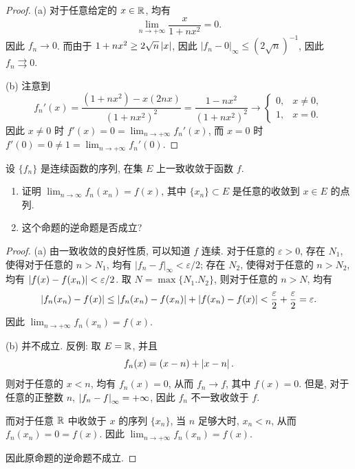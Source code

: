 \documentclass{article}
\begin{document}
\begin{proof}
  (a) 对于任意给定的 \( x\in\mathbb{R} \), 均有
  \[ \lim_{n\to+\infty}\frac{x}{1+nx^2}=0. \]
  因此 \( f_n\to 0 \). 而由于 \( 1+nx^2\ge 2\sqrt{n}\left|x\right| \), 因此 \( |f_n-0|_{\infty} \le (2\sqrt{n})^{-1} \), 因此 \( f_n \rightrightarrows 0 \).

  (b) 注意到
  \[ f_n'(x) = \frac{(1+nx^2)-x(2nx)}{(1+nx^2)^2}= \frac{1-nx^2}{(1+nx^2)^2} \to \begin{cases}
    0, & x\ne 0,\\
    1, & x=0.
  \end{cases} \]
  因此 \( x\neq 0 \) 时 \( f'(x)=0=\lim_{n\to+\infty}f_n'(x) \), 而 \( x=0 \) 时 \( f'(0)=0\ne 1=\lim_{n\to+\infty}f_n'(0) \).
\end{proof}



\begin{problem}
设 $\{f_n\}$ 是连续函数的序列, 在集 $E$ 上一致收敛于函数 $f$.
\begin{enumerate}[label=(\alph*)]
\item 证明 $\lim_{n\to\infty} f_n(x_n)=f(x)$, 其中 $\{x_n\}\subset E$ 是任意的收敛到 $x\in E$ 的点列.
\item 这个命题的逆命题是否成立?
\end{enumerate}
\end{problem}

\begin{proof}
  (a) 由一致收敛的良好性质, 可以知道 \( f \) 连续. 对于任意的 \( \varepsilon>0 \), 存在 \( N_1 \), 使得对于任意的 \( n>N_1 \), 均有 \( |f_n-f|_\infty<\varepsilon/2 \); 存在 \( N_2 \), 使得对于任意的 \( n>N_2 \), 均有 \( \left|f(x)-f(x_n)\right|<\varepsilon/2 \). 取 \( N=\max\{N_1.N_2\} \), 则对于任意的 \( n>N \), 均有
  \[ \left|f_n(x_n)-f(x)\right| \leq \left|f_n(x_n)-f(x_n)\right| + \left|f(x_n)-f(x)\right| < \frac{\varepsilon}{2}+\frac{\varepsilon}{2}=\varepsilon. \]
  因此 \( \lim_{n\to +\infty}f_n(x_n)=f(x) \). 

  (b) 并不成立. 反例: 取 \( E=\mathbb{R} \), 并且
  \[ f_n(x)= (x-n)+\left|x-n\right|. \]
  则对于任意的 \( x<n \), 均有 \( f_n(x)=0 \), 从而 \( f_n \to f \), 其中 \( f(x)=0 \). 但是, 对于任意的正整数 \( n \), \( \left|f_n-f\right|_{\infty}=+\infty \), 因此 \( f_n \) 不一致收敛于 \( f \).

  而对于任意 \( \mathbb{R} \) 中收敛于 \( x \) 的序列 \( \{x_n\} \), 当 \( n \) 足够大时, \( x_n < n \), 从而 \( f_n(x_n)=0=f(x) \). 因此 \( \lim_{n\to+\infty}f_n(x_n)=f(x) \). 

  因此原命题的逆命题不成立.
\end{proof}
\end{document}
